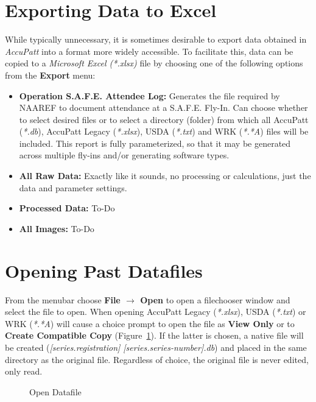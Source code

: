 \documentclass[10pt,letterpaper,titlepage]{article}
\begin{document}
    \section{Exporting Data to Excel}
    While typically unnecessary, it is sometimes desirable to export data obtained in \textit{AccuPatt} into a format more widely accessible. To facilitate this, data can be copied to a \textit{Microsoft Excel (*.xlsx)} file by choosing one of the following options from the \textbf{Export} menu:
    \begin{itemize}
        \item \textbf{Operation S.A.F.E. Attendee Log:} Generates the file required by NAAREF to document attendance at a S.A.F.E. Fly-In. Can choose whether to select desired files or to select a directory (folder) from which all AccuPatt (\textit{*.db}), AccuPatt Legacy (\textit{*.xlsx}), USDA (\textit{*.txt}) and WRK (\textit{*.*A}) files will be included. This report is fully parameterized, so that it may be generated across multiple fly-ins and/or generating software types. 
        \item \textbf{All Raw Data:} Exactly like it sounds, no processing or calculations, just the data and parameter settings.
        \item \textbf{Processed Data:} \color{red} To-Do \color{black}
        \item \textbf{All Images:} \color{red} To-Do \color{black}
    \end{itemize}
    \newpage

    \section{Opening Past Datafiles}
    From the menubar choose \textbf{File $\rightarrow$ Open} to open a filechooser window and select the file to open. When opening AccuPatt Legacy (\textit{*.xlsx}), USDA (\textit{*.txt}) or WRK (\textit{*.*A}) will cause a choice prompt to open the file as \textbf{View Only} or to \textbf{Create Compatible Copy} (Figure~\ref{fig:open}). If the latter is chosen, a native file will be created (\textit{[series.registration] [series.series-number].db}) and placed in the same directory as the original file. Regardless of choice, the original file is never edited, only read.
    \begin{figure}[hb]
        \centering
        \caption{Open Datafile}
        \label{fig:open}
    \end{figure}
    \newpage
\end{document}
